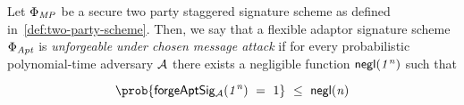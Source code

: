 \begin{definition} Let $\Phi_{\mathit{MP}}$ be a secure two party staggered signature scheme as defined in~\cref{def:two-party-scheme}. Then, we say that a flexible adaptor signature scheme $\Phi_{\mathit{Apt}}$ is \emph{unforgeable under chosen message attack}  if for every probabilistic polynomial-time adversary $\mathcal{A}$ there exists a negligible function $\mathsf{negl}(\mathit{1^n})$ such that 
	
	\[ \prob{\procExpForg{\varSecParam} \opEqNoQ 1} \opSmEq \funNegl{\varN} \]

\begin{center}
    \fbox{
    \begin{varwidth}{\textwidth}
        \procedure[linenumbering]{$\procExpForg{\varSecParam}$} {
        ((\varSecKeyAlice, \varPubKeyAlice), (\varSecKeyBob, \varPubKeyBob)) \opFunResult \procKeyGenPt{\varSecParam}{\varSecParam}\\
        (\varMsg^*) \opFunResult \cnstAdversary^{\procSignOracle{\cdot}{\cdot}}(\varPubKeyAlice, \varPubKeyBob, \varSecKeyBob) \\
        (\varSigAlice \opSeperate \varSigBob) \opFunResult \procSignPt{\varMsg}{\varSecKeyAlice, \varPubKeyAlice, \varPubKeyBob}{\varSecKeyBob, \varPubKeyAlice, \varPubKeyBob}\\
        (\varWit, \varStatement) \opFunResult \procGenR{\varSecParam}\\
        \varSigAptBob^* \opFunResult \cnstAdversary^{\procSignOracle{\cdot}{\cdot}}(\varSigBob, \varStatement) \\
        \pcreturn \procVerifyAptSig{\varSigAptBob^*}{\varMsg^*}{\varPubKeyAlice}{\varPubKeyBob}{\varStatement}}\\[2\baselineskip]
        \procedure[linenumbering]{$\procSignOracle{\varMsg}{\varSecKeyBob}$} {
        (\varSigAlice \opSeperate \varSigBob) \opFunResult \procSignPt{\varMsg}{\varSecKeyAlice, \varPubKeyAlice, \varPubKeyBob}{\varSecKeyBob, \varPubKeyAlice, \varPubKeyBob}\\
        \pcreturn (\varSigAlice \opSeperate \varSigBob)
        }
    \end{varwidth}
    }
\end{center}

	
\end{definition}


